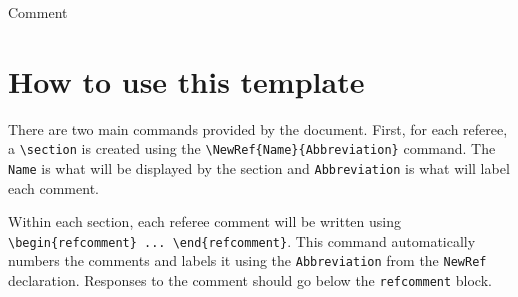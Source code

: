 \documentclass[12pt]{article}
\begin{document}
\begin{refcomment}
  Comment 
\end{refcomment}


\newpage
\section*{How to use this template}

There are two main commands provided by the document. First, for each referee, a  \texttt{\textbackslash section} is created using the \texttt{\textbackslash NewRef\{Name\}\{Abbreviation\}} command. The \texttt{Name} is what will be displayed by the section and \texttt{Abbreviation} is what will label each comment.

Within each section, each referee comment will be written using \texttt{\textbackslash begin\{refcomment\} ... \textbackslash end\{refcomment\}}. This command automatically numbers the comments and labels it using the \texttt{Abbreviation} from the \texttt{NewRef} declaration. Responses to the comment should go below the \texttt{refcomment} block.
\end{document}
